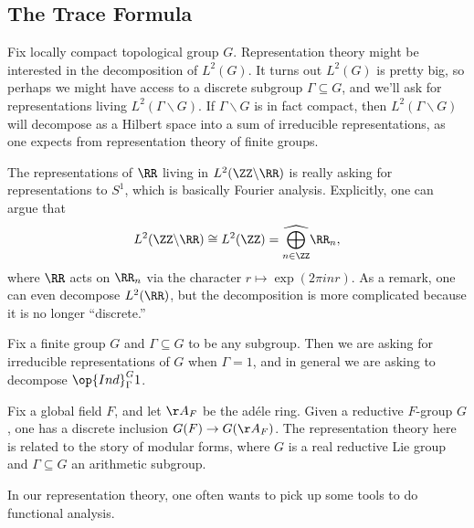 \documentclass{article}
\begin{document}
\subsection{The Trace Formula}
Fix locally compact topological group $G$. Representation theory might be interested in the decomposition of $L^2(G)$. It turns out $L^2(G)$ is pretty big, so perhaps we might have access to a discrete subgroup $\Gamma\subseteq G$, and we'll ask for representations living $L^2(\Gamma\backslash G)$. If $\Gamma\backslash G$ is in fact compact, then $L^2(\Gamma\backslash G)$ will decompose as a Hilbert space into a sum of irreducible representations, as one expects from representation theory of finite groups.
\begin{example} \label{ex:r-mod-z}
	The representations of $\RR$ living in $L^2(\ZZ\backslash\RR)$ is really asking for representations to $S^1$, which is basically Fourier analysis. Explicitly, one can argue that
	\[L^2(\ZZ\backslash\RR)\cong L^2(\ZZ)=\widehat{\bigoplus_{n\in\ZZ}}\RR_n,\]
	where $\RR$ acts on $\RR_n$ via the character $r\mapsto\exp(2\pi inr)$. As a remark, one can even decompose $L^2(\RR)$, but the decomposition is more complicated because it is no longer ``discrete.''
\end{example}
\begin{example} \label{ex:finite-group}
	Fix a finite group $G$ and $\Gamma\subseteq G$ to be any subgroup. Then we are asking for irreducible representations of $G$ when $\Gamma=1$, and in general we are asking to decompose $\op{Ind}_\Gamma^G1$.
\end{example}
\begin{example} \label{ex:adele}
	Fix a global field $F$, and let $\AA_F$ be the ad\'ele ring. Given a reductive $F$-group $G$, one has a discrete inclusion $G(F)\to G(\AA_F)$. The representation theory here is related to the story of modular forms, where $G$ is a real reductive Lie group and $\Gamma\subseteq G$ an arithmetic subgroup.
\end{example}
In our representation theory, one often wants to pick up some tools to do functional analysis.
\end{document}
